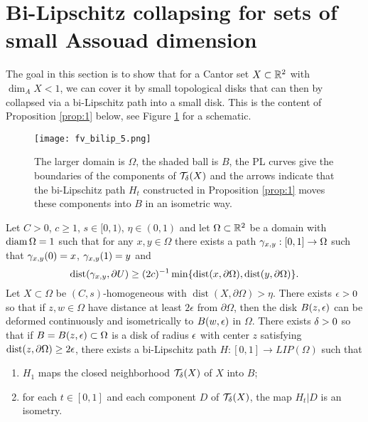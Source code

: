 \documentclass{amsart}
\DeclareMathOperator{\dist}{dist}
\begin{document}
\section{Bi-Lipschitz collapsing for sets of small Assouad dimension}\label{sec:collapse}


The goal in this section is to show that for a Cantor set $X\subset \mathbb{R}^2$ with $\dim_A X<1$, we can cover it by small topological disks that can then by collapsed via a bi-Lipschitz path into a small disk. This is the content of Proposition \ref{prop:1} below, see Figure \ref{fig:5} for a schematic.

\begin{figure}[h]
\begin{center}
\texttt{[image: fv\_bilip\_5.png]}
\caption{The larger domain is $\Omega$, the shaded ball is $B$, the PL curves give the boundaries of the components of $\mathcal{T}_{\delta}(X)$ and the arrows indicate that the bi-Lipschitz path $H_t$ constructed in Proposition \ref{prop:1} moves these components into $B$ in an isometric way.}
\label{fig:5}
\end{center}
\end{figure}


\begin{proposition}\label{prop:1}
Let $C>0$, $c\geq 1$, $s\in [0,1)$, $\eta \in (0,1)$ and let $\Omega \subset \mathbb{R}^2$ be a domain with $\operatorname{diam} \Omega =1$ such that for any $x,y \in \Omega$ there exists a path $\gamma_{x,y} : [0,1] \to \Omega$ such that $\gamma_{x,y}(0) = x$, $\gamma_{x,y}(1)=y$ and 
\begin{equation}\label{eq:cigar} 
\dist(\g_{x,y},\partial U) \geq (2c)^{-1}\min\{\dist(x,\partial \Omega), \dist(y,\partial \Omega)\}.
\end{equation}
Let $X\subset \Omega$ be $(C,s)$-homogeneous with $\dist(X,\partial\Omega) > \eta $.
There exists $\epsilon >0$ so that if $z,w \in \Omega$ have distance at least $2\epsilon$ from $\partial \Omega$, then the disk $B(z,\epsilon)$ can be deformed continuously and isometrically to $B(w,\epsilon)$ in $\Omega$. There exists $\delta >0$ so that if 
$B = B(z,\epsilon) \subset \Omega$ is a disk of radius $\epsilon$ with center $z$ satisfying $\dist (z,\partial \Omega)  \geq 2\e$, there exists a bi-Lipschitz path $H:[0,1] \to LIP(\Omega)$ such that
\begin{enumerate}
\item $H_1$ maps the closed neighborhood $\mathcal{T}_{\delta}(X)$  of $X$ into $B$;
\item for each $t\in [0,1]$ and each component $D$ of $\mathcal{T}_{\delta}(X)$, the map $H_t|D$ is an isometry. 
\end{enumerate}
\end{proposition}
\end{document}

